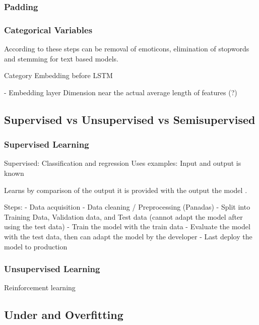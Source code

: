 \subsubsection{Padding}


\subsubsection{Categorical Variables}

According to \cite{alam2019impact} these steps can be removal of emoticons, elimination of stopwords and stemming for text based models.

Category Embedding before LSTM


- Embedding layer
Dimension near the actual average length of features (?)

\subsection{Supervised vs Unsupervised vs Semisupervised}

\subsubsection{Supervised Learning}
Supervised: Classification and regression
Uses  examples: Input and output is known

Learns by comparison of the output it is provided with the output the model .

Steps:
- Data acquisition
- Data cleaning / Preprocessing (Panadas)
- Split into Training Data, Validation data, and Test data (cannot adapt the model after using the test data)
- Train the model with the train data
- Evaluate the model with the test data, then can adapt the model by the developer
- Last deploy the model to production

\subsubsection{Unsupervised Learning}
Reinforcement learning
\subsection{Under and Overfitting}
